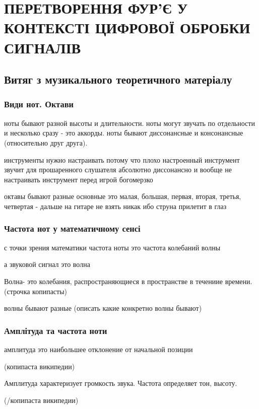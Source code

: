 \section{ПЕРЕТВОРЕННЯ ФУР'Є У КОНТЕКСТІ ЦИФРОВОЇ ОБРОБКИ СИГНАЛІВ}

\subsection{Витяг з музикального теоретичного матеріалу}

\subsubsection{Види нот. Октави}

ноты бывают разной высоты и длительности. ноты могут звучать по отдельности и несколько сразу - это аккорды. ноты бывают диссонансные и консонансные (относительно друг друга).

инструменты нужно настраивать потому что плохо настроенный инструмент звучит для прошаренного слушателя абсолютно диссонансно и вообще не настраивать инструмент перед игрой богомерзко

октавы бывают разные
основные это малая, большая, первая, вторая, третья, четвертая - дальше на гитаре не взять никак ибо струна прилетит в глаз

\subsubsection{Частота нот у математичному сенсі}

с точки зрения математики частота ноты это частота колебаний волны

а звуковой сигнал это волна

Волна- это колебания, распространяющиеся в пространстве в течениие времени. (строчка копипасты)

волны бывают разные (описать какие конкретно волны бывают)

\subsubsection{Амплітуда та частота ноти}

амплитуда это наибольшее отклонение от начальной позиции

(копипаста википедии)

Амплитуда характеризует громкость звука. Частота определяет тон, высоту.

(/копипаста википедии)

